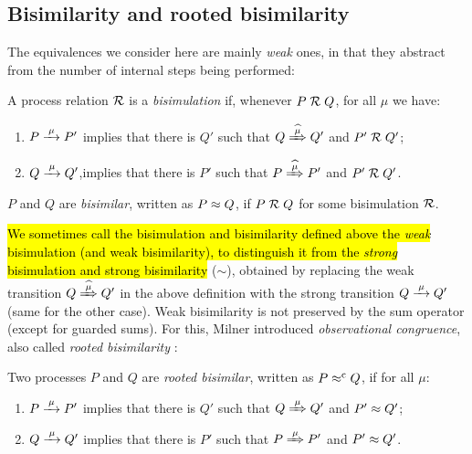 \subsection{Bisimilarity and rooted bisimilarity}
\label{ss:BiEx}

The equivalences we consider here are mainly \emph{weak} ones, in that they
abstract from the number of internal steps being performed:
\begin{definition}%
\label{d:wb}
A process relation ${{\cal R}}$ is a \emph{bisimulation} if, whenever
 $P\mathrel{\cal R} Q$, for all $\mu$ we have:
\begin{enumerate}
\item $P \arr\mu P'$ implies that there is $Q'$ such that $Q \Arcap \mu Q'$ and $P' \mathrel{\cal R} Q'$;
\item $Q \arr\mu Q'$,implies that there is $P'$ such that $P \Arcap
  \mu P'$ and $P' \mathrel{\cal R} Q'$\enspace.
\end{enumerate}
 $P$ and $Q$ are \emph{bisimilar},
written as $P \approx Q$, if $P \mathrel{\cal R} Q$ for some bisimulation ${\cal R}$.
\end{definition}

\hl{We sometimes call the bisimulation and bisimilarity defined above
the \emph{weak} bisimulation (and weak bisimilarity), to
distinguish it from the \emph{strong} bisimulation and strong bisimilarity} ($\sim$),
obtained by replacing the weak transition $Q\Arcap\mu Q'$ in the above
definition with the strong transition $Q \arr \mu Q'$ (same for the
other case).
Weak bisimilarity is not preserved by the sum operator (except for
guarded sums). For this, Milner introduced \emph{observational congruence}, also called \emph{rooted
  bisimilarity} \cite{Gorrieri:2015jt,Sangiorgi:2011ut}:
\begin{definition}%
\label{d:rootedBisimilarity}
Two processes $P$ and $Q$ are \emph{rooted bisimilar}, written as $P
\mathrel{\approx^{\rm{c}}} Q$, if
for all $\mu$:
\begin{enumerate}
 \item  $P \arr\mu P'$ implies that there is $Q'$ such that $Q
   \Arr\mu Q'$ and $P' \approx Q'$;
 \item  $Q \arr\mu Q'$ implies that there is $P'$ such that $P
   \Arr\mu P'$ and $P' \approx Q'$\enspace.
\end{enumerate}
\end{definition}

